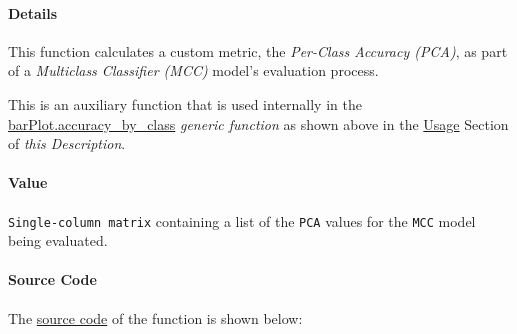 \documentclass[
]{report}
\begin{document}
\protect{}\label{func.MCClassifier.accuracy.by_class.details}
\paragraph{Details}\label{details-5}

\hfill\break

This function calculates a custom metric, the \emph{Per-Class Accuracy (PCA)}, as part of a \emph{Multiclass Classifier (MCC)} model's evaluation process.

\begin{noteblock}
This is an auxiliary function that is used internally in the \href{https://github.com/AzKurban-edX-DS/edx.capstone.choose-your-own/blob/main/r/support-functions/models-helper.R\#L968}{barPlot.accuracy\_by\_class} \emph{generic function} as shown above in the \hyperref[func.MCClassifier.accuracy.by_class.usage]{Usage} Section of \emph{this Description}.

\end{noteblock}

\protect{}\label{func.MCClassifier.accuracy.by_class.value}
\paragraph{Value}\label{value-4}

\hfill\break

\texttt{Single-column\ matrix} containing a list of the \texttt{PCA} values for the \texttt{MCC} model being evaluated.

\newpage

\protect{}\label{func.MCClassifier.accuracy.by_class.code}
\paragraph{Source Code}\label{source-code-5}

\hfill\break

The \href{https://github.com/AzKurban-edX-DS/edx.capstone.choose-your-own/blob/main/r/support-functions/models-helper.R\#L901}{source code} of the function is shown below:
\end{document}
